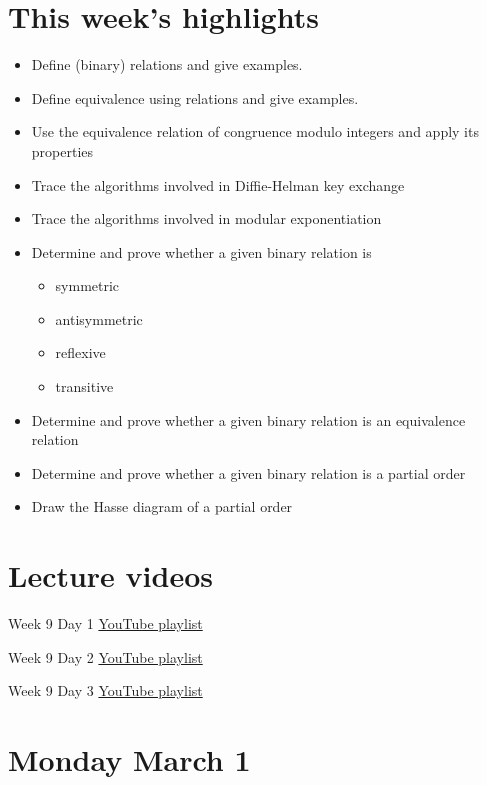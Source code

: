 \documentclass[12pt, oneside]{article}
\begin{document}
\begin{flushright}
\end{flushright}

\section*{This week's highlights}
\begin{itemize}
\item Define (binary) relations and give examples.
\item Define equivalence using relations and give examples.
\item Use the equivalence relation of congruence modulo integers and apply its properties
\item Trace the algorithms involved in Diffie-Helman key exchange
\item Trace the algorithms involved in modular exponentiation
\item Determine and prove whether a given binary relation is
\begin{itemize}
\item symmetric
\item antisymmetric
\item reflexive
\item transitive
\end{itemize}
\item Determine and prove whether a given binary relation is an equivalence relation
\item Determine and prove whether a given binary relation is a partial order
\item Draw the Hasse diagram of a partial order
\end{itemize}

\section*{Lecture videos}
Week 9 Day 1
\href{https://youtube.com/playlist?list=PLML4QilACLk4qF_srbNXwhV_CbLjv_cg8}{YouTube playlist}

Week 9 Day 2
\href{https://youtube.com/playlist?list=PLML4QilACLk4DKz8D5EjwZ5QWXpBG8R17}{YouTube playlist}

Week 9 Day 3
\href{https://youtube.com/playlist?list=PLML4QilACLk4ef0s6DQNGUiZpgLSNZe7c}{YouTube playlist}

\newpage
\section*{Monday March 1}
\end{document}

